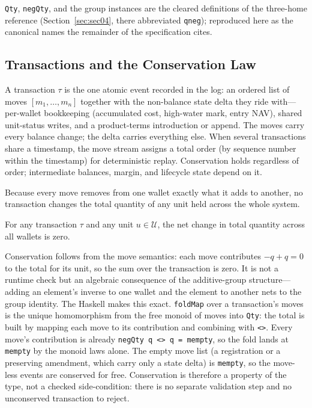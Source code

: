 \texttt{Qty}, \texttt{negQty}, and the group instances are the cleared definitions of the three-home reference (Section~\ref{sec:sec04}, there abbreviated \texttt{qneg}); reproduced here as the canonical names the remainder of the specification cites.

\subsection{Transactions and the Conservation Law}

\begin{definition}[Transaction]
A transaction $\tau$ is the one atomic event recorded in the log: an ordered list of moves $[m_1,\ldots,m_n]$ together with the non-balance state delta they ride with---per-wallet bookkeeping (accumulated cost, high-water mark, entry NAV), shared unit-status writes, and a product-terms introduction or append. The moves carry every balance change; the delta carries everything else. When several transactions share a timestamp, the move stream assigns a total order (by sequence number within the timestamp) for deterministic replay. Conservation holds regardless of order; intermediate balances, margin, and lifecycle state depend on it.
\end{definition}

Because every move removes from one wallet exactly what it adds to another, no transaction changes the total quantity of any unit held across the whole system.

\begin{principle}
\label{cond:conservation}
For any transaction $\tau$ and any unit $u \in \mathcal{U}$, the net change in total quantity across all wallets is zero.
\end{principle}

Conservation follows from the move semantics: each move contributes $-q + q = 0$ to the total for its unit, so the sum over the transaction is zero. It is not a runtime check but an algebraic consequence of the additive-group structure---adding an element's inverse to one wallet and the element to another nets to the group identity. The Haskell makes this exact. \texttt{foldMap} over a transaction's moves is the unique homomorphism from the free monoid of moves into \texttt{Qty}: the total is built by mapping each move to its contribution and combining with \texttt{<>}. Every move's contribution is already \texttt{negQty q <> q = mempty}, so the fold lands at \texttt{mempty} by the monoid laws alone. The empty move list (a registration or a preserving amendment, which carry only a state delta) is \texttt{mempty}, so the move-less events are conserved for free. Conservation is therefore a property of the type, not a checked side-condition: there is no separate validation step and no unconserved transaction to reject.

